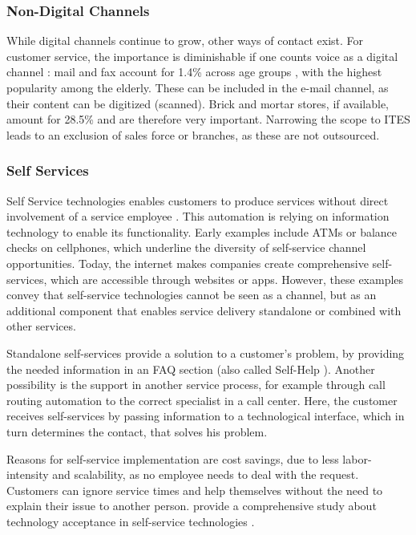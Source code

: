 		\subsubsection{Non-Digital Channels}
		While digital channels continue to grow, other ways of contact exist. For customer service, the importance is diminishable if one counts voice as a digital channel : mail and fax account for 1.4\% across age groups \citep{Agnischock2015}, with the highest popularity among the elderly. These can be included in the e-mail channel, as their content can be digitized (\viz scanned). Brick and mortar stores, if available, amount for 28.5\% and are therefore very important. Narrowing the scope to \acrshort{ITES} leads to an exclusion of sales force or branches, as these are not outsourced. 
		
	
	\subsubsection{Self Services}
	\label{sec:ss}
		Self Service technologies enables customers to produce services without direct involvement of a service employee \citep{meuter2000self}. This automation is relying on information technology to enable its functionality. Early examples include ATMs or balance checks on cellphones, which underline the diversity of self-service channel opportunities. Today, the internet makes companies create comprehensive self-services, which are accessible through websites or apps. However, these examples convey that self-service technologies cannot be seen as a channel, but as an additional component that enables service delivery standalone or combined with other services. 
		
		Standalone self-services provide a solution to a customer's problem, \ie by providing the needed information in an \acrshort{FAQ} section (also called Self-Help \citep{meuter2000self}). Another possibility is the support in another service process, for example through call routing automation to the correct specialist in a call center. Here, the customer receives self-services by passing information to a technological interface, which in turn determines the contact, that solves his problem.  
		
		Reasons for self-service implementation are cost savings, due to less labor-intensity and scalability, as no employee needs to deal with the request. Customers can ignore service times and help themselves without the need to explain their issue to another person. \citeauthor{Blut_2016} provide a comprehensive study about technology acceptance in self-service technologies \citep{Blut_2016}. 
		
